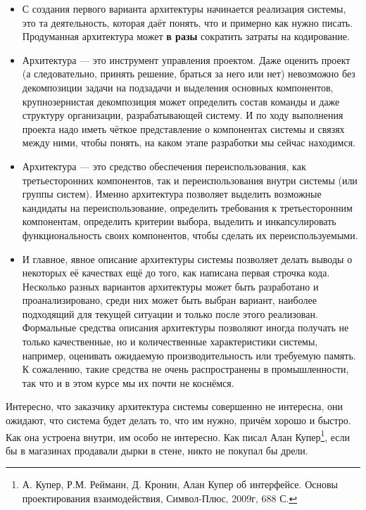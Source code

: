 \documentclass[a5paper]{article}
\begin{document}
\begin{itemize}
	\item С создания первого варианта архитектуры начинается реализация системы, это та деятельность, которая даёт понять, что и примерно как нужно писать. Продуманная архитектура может \textbf{в разы} сократить затраты на кодирование.
	\item Архитектура --- это инструмент управления проектом. Даже оценить проект (а следовательно, принять решение, браться за него или нет) невозможно без декомпозиции задачи на подзадачи и выделения основных компонентов, крупнозернистая декомпозиция может определить состав команды и даже структуру организации, разрабатывающей систему. И по ходу выполнения проекта надо иметь чёткое представление о компонентах системы и связях между ними, чтобы понять, на каком этапе разработки мы сейчас находимся.
	\item Архитектура --- это средство обеспечения переиспользования, как третьесторонних компонентов, так и переиспользования внутри системы (или группы систем). Именно архитектура позволяет выделить возможные кандидаты на переиспользование, определить требования к третьесторонним компонентам, определить критерии выбора, выделить и инкапсулировать функциональность своих компонентов, чтобы сделать их переиспользуемыми.
	\item И главное, явное описание архитектуры системы позволяет делать выводы о некоторых её качествах ещё до того, как написана первая строчка кода. Несколько разных вариантов архитектуры может быть разработано и проанализировано, среди них может быть выбран вариант, наиболее подходящий для текущей ситуации и только после этого реализован. Формальные средства описания архитектуры позволяют иногда получать не только качественные, но и количественные характеристики системы, например, оценивать ожидаемую производительность или требуемую память. К сожалению, такие средства не очень распространены в промышленности, так что и в этом курсе мы их почти не коснёмся.
\end{itemize}

Интересно, что заказчику архитектура системы совершенно не интересна, они ожидают, что система будет делать то, что им нужно, причём хорошо и быстро. Как она устроена внутри, им особо не интересно. Как писал Алан Купер\footnote{А. Купер, Р.М. Рейманн, Д. Кронин, Алан Купер об интерфейсе. Основы проектирования взаимодействия, Символ-Плюс, 2009г, 688 С.}, если бы в магазинах продавали дырки в стене, никто не покупал бы дрели.
\end{document}
